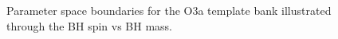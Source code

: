 \documentclass[binding=0.6cm, LaM]{sapthesis}
\begin{document}
		\begin{figure}[H]
                        \noindent
                        \label{banktest}
                        \centering
                        \caption{Parameter space boundaries for the O3a template bank illustrated through the BH spin vs BH mass.}
                        \label{fig:banktest}
                \end{figure}
\end{document}
